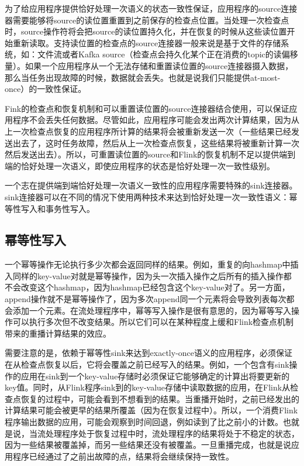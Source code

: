 \documentclass[cn,11pt,chinese]{elegantbook}
\begin{document}
为了给应用程序提供恰好处理一次语义的状态一致性保证，应用程序的source连接器需要能够将source的读位置重置到之前保存的检查点位置。当处理一次检查点时，source操作符将会把source的读位置持久化，并在恢复的时候从这些读位置开始重新读取。支持读位置的检查点的source连接器一般来说是基于文件的存储系统，如：文件流或者Kafka source（检查点会持久化某个正在消费的topic的读偏移量）。如果一个应用程序从一个无法存储和重置读位置的source连接器摄入数据，那么当任务出现故障的时候，数据就会丢失。也就是说我们只能提供at-most-once）的一致性保证。

Fink的检查点和恢复机制和可以重置读位置的source连接器结合使用，可以保证应用程序不会丢失任何数据。尽管如此，应用程序可能会发出两次计算结果，因为从上一次检查点恢复的应用程序所计算的结果将会被重新发送一次（一些结果已经发送出去了，这时任务故障，然后从上一次检查点恢复，这些结果将被重新计算一次然后发送出去）。所以，可重置读位置的source和Flink的恢复机制不足以提供端到端的恰好处理一次语义，即使应用程序的状态是恰好处理一次一致性级别。

一个志在提供端到端恰好处理一次语义一致性的应用程序需要特殊的sink连接器。sink连接器可以在不同的情况下使用两种技术来达到恰好处理一次一致性语义：幂等性写入和事务性写入。

\subsection{幂等性写入}

一个幂等操作无论执行多少次都会返回同样的结果。例如，重复的向hashmap中插入同样的key-value对就是幂等操作，因为头一次插入操作之后所有的插入操作都不会改变这个hashmap，因为hashmap已经包含这个key-value对了。另一方面，append操作就不是幂等操作了，因为多次append同一个元素将会导致列表每次都会添加一个元素。在流处理程序中，幂等写入操作是很有意思的，因为幂等写入操作可以执行多次但不改变结果。所以它们可以在某种程度上缓和Flink检查点机制带来的重播计算结果的效应。

需要注意的是，依赖于幂等性sink来达到exactly-once语义的应用程序，必须保证在从检查点恢复以后，它将会覆盖之前已经写入的结果。例如，一个包含有sink操作的应用在sink到一个key-value存储时必须保证它能够确定的计算出将要更新的key值。同时，从Flink程序sink到的key-value存储中读取数据的应用，在Flink从检查点恢复的过程中，可能会看到不想看到的结果。当重播开始时，之前已经发出的计算结果可能会被更早的结果所覆盖（因为在恢复过程中）。所以，一个消费Flink程序输出数据的应用，可能会观察到时间回退，例如读到了比之前小的计数。也就是说，当流处理程序处于恢复过程中时，流处理程序的结果将处于不稳定的状态，因为一些结果被覆盖掉，而另一些结果还没有被覆盖。一旦重播完成，也就是说应用程序已经通过了之前出故障的点，结果将会继续保持一致性。
\end{document}
